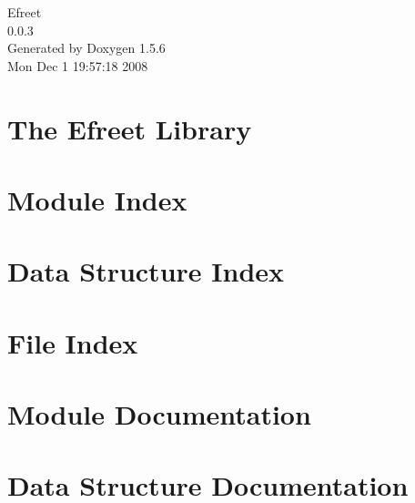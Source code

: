 \documentclass[a4paper]{book}
\begin{document}
\begin{titlepage}
\vspace*{7cm}
\begin{center}
{\Large Efreet \\[1ex]\large 0.0.3 }\\
\vspace*{1cm}
{\large Generated by Doxygen 1.5.6}\\
\vspace*{0.5cm}
{\small Mon Dec 1 19:57:18 2008}\\
\end{center}
\end{titlepage}
\clearemptydoublepage
{}
\tableofcontents
\clearemptydoublepage
{}
\chapter{The Efreet Library}
\label{index}
\chapter{Module Index}

\chapter{Data Structure Index}

\chapter{File Index}

\chapter{Module Documentation}








\chapter{Data Structure Documentation}































\end{document}
